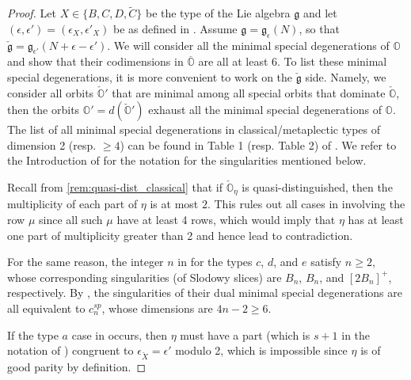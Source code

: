 \documentclass[11pt, a4paper]{amsart}
\newcommand{\g}{\mathfrak{g}}
\newcommand{\orb}{\mathbb{O}}
\newcommand{\fg}{\mathfrak{g}}
\newcommand{\ckfg}{{\check{\fg}}}
\newcommand{\ckorb}{\check{\orb}}
\newcommand{\mC}{\widetilde{C}}
\theoremstyle{definition}
\numberwithin{equation}{section}
\begin{document}
\begin{proof}

Let $X \in \{B, C, D, \mC\}$ be the type of the Lie algebra $\g$ and let $(\epsilon, \epsilon') = (\epsilon_X, \epsilon'_X)$ be as defined in . Assume $\fg = \fg_{\epsilon}(N)$, so that $\ckfg = \fg_{\epsilon'}(N + \epsilon - \epsilon')$. 
We will consider all the minimal special degenerations of $\orb$ and show that their codimensions in $\overline{\orb}$ are all at least $6$. To list these minimal special degenerations, it is more convenient to work on the $\ckfg$ side. Namely, we consider all orbits $\ckorb'$ that are minimal among all special orbits that dominate $\ckorb$, then the orbits $\orb' = d(\ckorb')$ exhaust all the minimal special degenerations of $\orb$. The list of all minimal special degenerations in classical/metaplectic types of dimension 2 (resp. $\geqslant 4$) can be found in Table 1 (resp. Table 2) of \cite{JLS:Duality}. We refer to the Introduction of \cite{JLS:Duality} for the notation for the singularities mentioned below.

Recall from \cref{rem:quasi-dist_classical} that if $\ckorb_\eta$ is quasi-distinguished, then the multiplicity of each part of $\eta$ is at most $2$. This rules out all cases in \cite[Table 2]{JLS:Duality} involving the row $\mu$ since all such $\mu$ have at least 4 rows, which would imply that $\eta$ has at least one part of multiplicity greater than 2 and hence lead to contradiction. 

For the same reason, the integer $n$ in \cite[Table 1]{JLS:Duality} for the types $c$, $d$, and $e$ satisfy $n \geqslant 2$, whose corresponding singularities (of Slodowy slices) are $B_n$, $B_n$, and $[2B_n]^+$, respectively. By \cite[Figure 2]{JLS:Duality}, the singularities of their dual minimal special degenerations are all equivalent to $c_n^{sp}$, whose dimensions are $4n - 2 \geqslant 6$.

If the type $a$ case in \cite[Table 1]{JLS:Duality} occurs, then $\eta$ must have a part (which is $s+1$ in the notation of \cite[Table 1]{JLS:Duality}) congruent to $\epsilon_{\check{X}} = \epsilon'$ modulo 2, which is impossible since $\eta$ is of good parity by definition.


\end{proof}
\end{document}
